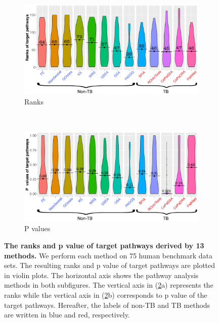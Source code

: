 \begin{figure} [!t]
        \begin{subfigure}[h]{0.99\textwidth}
                \includegraphics[width=0.98\linewidth]{../Figures/Rank_individual}
                  \caption{Ranks}
                \label{rankCom}
        \end{subfigure}\\
        \begin{subfigure}[h]{0.991\textwidth}
                \includegraphics[width=0.98\linewidth]{../Figures/Pvalue_individual}
                \caption{P values}
        \end{subfigure}
        \caption{\textbf{The ranks and p value of target pathways derived by 13 methods.} We perform each method on 75 human benchmark data sets. The resulting ranks and p value of target pathways are plotted in violin plots. The horizontal axis shows the pathway analysis methods in both subfigures. The vertical axis in (\ref{overview}a) represents the ranks while the vertical axis in (\ref{overview}b) corresponds to p value of the target pathways. Hereafter, the labels of non-TB and TB methods are written in blue and red, respectively.}
        \label{overview}
\end{figure}

